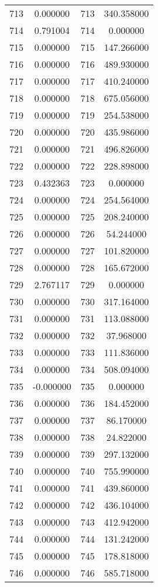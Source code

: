 \documentclass[12pt]{article}
\begin{document}
\begin{longtable}{@{}cccc@{}}
713 & 0.000000 & 713 & 340.358000 \\
714 & 0.791004 & 714 & 0.000000 \\
715 & 0.000000 & 715 & 147.266000 \\
716 & 0.000000 & 716 & 489.930000 \\
717 & 0.000000 & 717 & 410.240000 \\
718 & 0.000000 & 718 & 675.056000 \\
719 & 0.000000 & 719 & 254.538000 \\
720 & 0.000000 & 720 & 435.986000 \\
721 & 0.000000 & 721 & 496.826000 \\
722 & 0.000000 & 722 & 228.898000 \\
723 & 0.432363 & 723 & 0.000000 \\
724 & 0.000000 & 724 & 254.564000 \\
725 & 0.000000 & 725 & 208.240000 \\
726 & 0.000000 & 726 & 54.244000 \\
727 & 0.000000 & 727 & 101.820000 \\
728 & 0.000000 & 728 & 165.672000 \\
729 & 2.767117 & 729 & 0.000000 \\
730 & 0.000000 & 730 & 317.164000 \\
731 & 0.000000 & 731 & 113.088000 \\
732 & 0.000000 & 732 & 37.968000 \\
733 & 0.000000 & 733 & 111.836000 \\
734 & 0.000000 & 734 & 508.094000 \\
735 & -0.000000 & 735 & 0.000000 \\
736 & 0.000000 & 736 & 184.452000 \\
737 & 0.000000 & 737 & 86.170000 \\
738 & 0.000000 & 738 & 24.822000 \\
739 & 0.000000 & 739 & 297.132000 \\
740 & 0.000000 & 740 & 755.990000 \\
741 & 0.000000 & 741 & 439.860000 \\
742 & 0.000000 & 742 & 436.104000 \\
743 & 0.000000 & 743 & 412.942000 \\
744 & 0.000000 & 744 & 131.242000 \\
745 & 0.000000 & 745 & 178.818000 \\
746 & 0.000000 & 746 & 585.718000 \\

\end{longtable}
\end{document}
